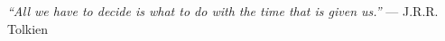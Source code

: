 


\frontmatter %

\pagestyle{plain} %

\maketitlepage


\makeconttitlepage







\begin{dedicatory}
\null \vfill
\begin{flushright}

\textit{“All we have to decide is what to do with the time that is given us.”} — J.R.R. Tolkien

\end{flushright}
\vfill \null%
\end{dedicatory}


